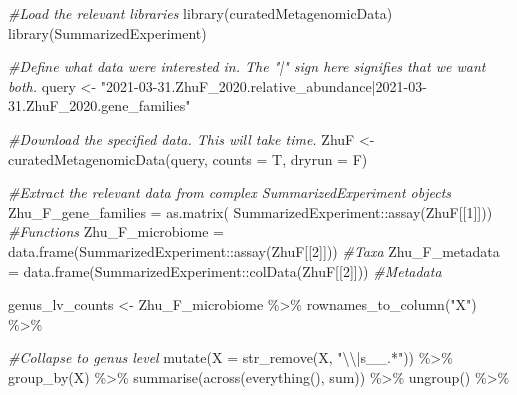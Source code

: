 \documentclass[
]{article}
\newenvironment{Shaded}{\begin{snugshade}}{\end{snugshade}}
\newcommand{\AttributeTok}[1]{\textcolor[rgb]{0.77,0.63,0.00}{#1}}
\newcommand{\CommentTok}[1]{\textcolor[rgb]{0.56,0.35,0.01}{\textit{#1}}}
\newcommand{\DecValTok}[1]{\textcolor[rgb]{0.00,0.00,0.81}{#1}}
\newcommand{\FunctionTok}[1]{\textcolor[rgb]{0.00,0.00,0.00}{#1}}
\newcommand{\NormalTok}[1]{#1}
\newcommand{\OtherTok}[1]{\textcolor[rgb]{0.56,0.35,0.01}{#1}}
\newcommand{\SpecialCharTok}[1]{\textcolor[rgb]{0.00,0.00,0.00}{#1}}
\newcommand{\StringTok}[1]{\textcolor[rgb]{0.31,0.60,0.02}{#1}}
\begin{document}
\begin{Shaded}
\begin{Highlighting}[]
\CommentTok{\#Load the relevant libraries}
\FunctionTok{library}\NormalTok{(curatedMetagenomicData)}
\FunctionTok{library}\NormalTok{(SummarizedExperiment)}

\CommentTok{\#Define what data we\textquotesingle{}re interested in. The "|" sign here signifies that we want both.}
\NormalTok{query }\OtherTok{\textless{}{-}} \StringTok{"2021{-}03{-}31.ZhuF\_2020.relative\_abundance|2021{-}03{-}31.ZhuF\_2020.gene\_families"}

\CommentTok{\#Download the specified data. This will take time. }
\NormalTok{ZhuF }\OtherTok{\textless{}{-}} \FunctionTok{curatedMetagenomicData}\NormalTok{(query, }\AttributeTok{counts =}\NormalTok{ T, }\AttributeTok{dryrun =}\NormalTok{ F)}

\CommentTok{\#Extract the relevant data from complex SummarizedExperiment objects}
\NormalTok{Zhu\_F\_gene\_families }\OtherTok{=} \FunctionTok{as.matrix}\NormalTok{( SummarizedExperiment}\SpecialCharTok{::}\FunctionTok{assay}\NormalTok{(ZhuF[[}\DecValTok{1}\NormalTok{]]))     }\CommentTok{\#Functions}
\NormalTok{Zhu\_F\_microbiome    }\OtherTok{=} \FunctionTok{data.frame}\NormalTok{(SummarizedExperiment}\SpecialCharTok{::}\FunctionTok{assay}\NormalTok{(ZhuF[[}\DecValTok{2}\NormalTok{]]))    }\CommentTok{\#Taxa}
\NormalTok{Zhu\_F\_metadata      }\OtherTok{=} \FunctionTok{data.frame}\NormalTok{(SummarizedExperiment}\SpecialCharTok{::}\FunctionTok{colData}\NormalTok{(ZhuF[[}\DecValTok{2}\NormalTok{]]))  }\CommentTok{\#Metadata}

\NormalTok{genus\_lv\_counts }\OtherTok{\textless{}{-}}\NormalTok{ Zhu\_F\_microbiome }\SpecialCharTok{\%\textgreater{}\%} 
  \FunctionTok{rownames\_to\_column}\NormalTok{(}\StringTok{"X"}\NormalTok{) }\SpecialCharTok{\%\textgreater{}\%}
  
  \CommentTok{\#Collapse to genus level}
  \FunctionTok{mutate}\NormalTok{(}\AttributeTok{X =} \FunctionTok{str\_remove}\NormalTok{(X, }\StringTok{"}\SpecialCharTok{\textbackslash{}\textbackslash{}}\StringTok{|s\_\_.*"}\NormalTok{)) }\SpecialCharTok{\%\textgreater{}\%} 
  \FunctionTok{group\_by}\NormalTok{(X) }\SpecialCharTok{\%\textgreater{}\%} 
  \FunctionTok{summarise}\NormalTok{(}\FunctionTok{across}\NormalTok{(}\FunctionTok{everything}\NormalTok{(), sum)) }\SpecialCharTok{\%\textgreater{}\%} 
  \FunctionTok{ungroup}\NormalTok{() }\SpecialCharTok{\%\textgreater{}\%} 
  

\end{Highlighting}
\end{Shaded}
\end{document}
